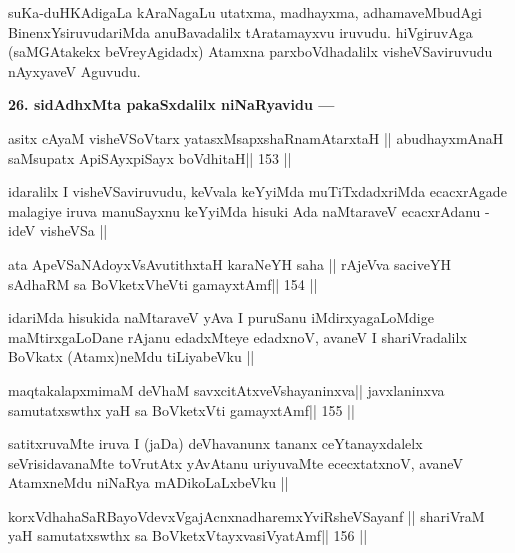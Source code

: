 \begin{artha}
suKa-duHKAdigaLa kAraNagaLu utatxma, madhayxma, adhamaveMbudAgi 
BinenxYsiruvudariMda anuBavadalilx tAratamayxvu iruvudu. hiVgiruvAga (saMGAtakekx beVreyAgidadx) Atamxna parxboVdhadalilx visheVSaviruvudu nAyxyaveV Aguvudu.
\end{artha}

\begin{artha}
{\bf 26. sidAdhxMta pakaSxdalilx niNaRyavidu ---}
\end{artha}

\begin{shl}
asitx cAyaM visheVSoV\s tarx yatasxMsapxshaRnamAtarxtaH ||
abudhayxmAnaH saMsupatx ApiSAyx\s\s piSayx boVdhitaH\hfill || 153 ||
\end{shl}

\begin{artha}
idaralilx I visheVSaviruvudu, keVvala keYyiMda muTiTxdadxriMda 
ecacxrAgade malagiye iruva manuSayxnu keYyiMda hisuki Ada naMtaraveV ecacxrAdanu - ideV visheVSa ||
\end{artha}

\begin{shl}
ata ApeVSaNAdoyxV\s sAvutithxtaH karaNeYH saha ||
rAjeVva saciveYH sAdhaRM sa BoVketxVheVti gamayxtAmf\hfill || 154 ||
\end{shl}

\begin{artha}
idariMda hisukida naMtaraveV yAva I puruSanu iMdirxyagaLoMdige maMtirxgaLoDane rAjanu edadxMteye edadxnoV, avaneV I shariVradalilx BoVkatx (Atamx)neMdu tiLiyabeVku ||
\end{artha}

\begin{shl}
maqtakalapxmimaM deVhaM savxcitAtxveVshayaninxva\footnotemark[7] ||
javxlaninxva samutatxswthx yaH sa BoVketxVti gamayxtAmf\hfill || 155 ||
\end{shl}

\begin{artha}
satitxruvaMte iruva I (jaDa) deVhavanunx tananx ceYtanayxdalelx 
seVrisidavanaMte toVrutAtx yAvAtanu uriyuvaMte ececxtatxnoV, avaneV AtamxneMdu niNaRya mADikoLaLxbeVku ||
\end{artha}

\begin{shl}
korxVdhahaSaRBayoVdevxVgajAcnxnadharemxYviRsheVSayanf ||
shariVraM yaH samutatxswthx sa BoVketxVtayxvasiVyatAmf\hfill || 156 ||
\end{shl}

